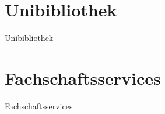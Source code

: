 
\section{Unibibliothek}
\begin{frame}{Unibibliothek}
\end{frame}


\section{Fachschaftsservices}
\begin{frame}{Fachschaftsservices}
\end{frame}


